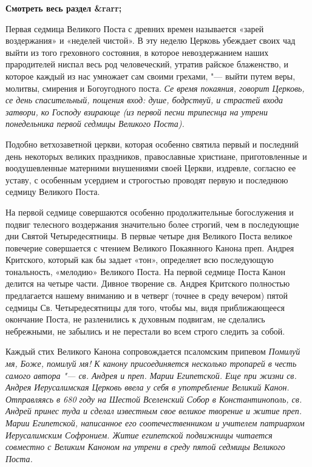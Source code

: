 


\bfseries Смотреть весь раздел &rarr;\normalfont{} 

 

Первая седмица Великого Поста с древних времен
называется «зарей воздержания» и «неделей
чистой». В эту неделю Церковь убеждает своих чад
выйти из того греховного состояния, в которое
невоздержанием наших прародителей ниспал весь
род человеческий, утратив райское блаженство, и
которое каждый из нас умножает сам своими
грехами, "--- выйти путем веры, молитвы, смирения и
Богоугодного поста. \itshape Се время покаяния, говорит
Церковь, се день спасительный, пощения вход: душе,
бодрствуй, и страстей входа затвори, ко Господу
взирающе\normalfont{}  (из первой песни трипеснца на
утрени понедельника первой седмицы Великого
Поста).


Подобно ветхозаветной церкви, которая особенно
святила первый и последний день некоторых
великих праздников, православные христиане,
приготовленные и воодушевленные матерними
внушениями своей Церкви, издревле, согласно ее
уставу, с особенным усердием и строгостью
проводят первую и последнюю седмицу Великого
Поста.


На первой седмице совершаются особенно
продолжительные богослужения и подвиг телесного
воздержания значительно более строгий, чем в
последующие дни Святой Четыредесятницы. В первые
четыре дня Великого Поста великое повечерие
совершается с чтением Великого Покаянного
Канона преп. Андрея Критского, который как бы
задает «тон», определяет всю последующую
тональность, «мелодию» Великого Поста. На первой
седмице Поста Канон делится на четыре части.
Дивное творение св. Андрея Критского полностью
предлагается нашему вниманию и в четверг (точнее
в среду вечером) пятой седмицы Св.
Четыредесятницы для того, чтобы мы, видя
приближающееся окончание Поста, не разленились к
духовным подвигам, не сделались небрежными, не
забылись и не перестали во всем строго следить за
собой.


Каждый стих Великого Канона сопровождается
псаломским припевом \itshape Помилуй мя, Боже, помилуй
мя!\normalfont{} К канону присоединяется несколько тропарей
в честь самого автора "--- св. Андрея и преп. Марии
Египетской. Еще при жизни св. Андрея
Иерусалимская Церковь ввела у себя в
употребление Великий Канон. Отправляясь в 680 году
на Шестой Вселенский Собор в Константинополь, св.
Андрей принес туда и сделал известным свое
великое творение и житие преп. Марии Египетской,
написанное его соотечественником и учителем
патриархом Иерусалимским Софронием. Житие
египетской подвижницы читается совместно с
Великим Каноном на утрени в среду пятой седмицы
Великого Поста.



